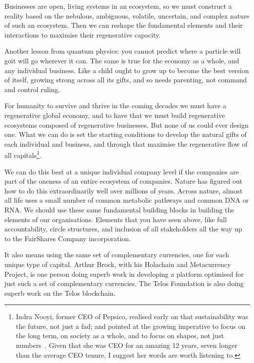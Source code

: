 Businesses are open, living systems in an ecosystem, so we must construct a reality based on the nebulous, ambiguous, volatile, uncertain, and complex nature of such an ecosystem. Then we can reshape the fundamental elements and their interactions to maximise their regenerative capacity.


Another lesson from quantum physics: you cannot predict where a particle will go\textemdash it will go wherever it can. The same is true for the economy as a whole, and any individual business. Like a child ought to grow up to become the best version of itself, growing strong across all its gifts, and so needs parenting, not command and control ruling. 


For humanity to survive and thrive in the coming decades we must have a regenerative global economy,  and to have that we must build regenerative ecosystems composed of regenerative businesses. But none of us could ever design one. What we can do is set the starting conditions to develop the natural gifts of each individual and business, and through that maximise the regenerative flow of all capitals\footnote{Indra Nooyi, former CEO of Pepsico, realised early on that sustainability was the future, not just a fad; and pointed at the growing imperative to focus on the long term, on society as a whole, and to focus on shapes, not just numbers~\cite{nooyi-shapes}. Given that she was CEO for an amazing 12 years, seven longer than the average CEO tenure, I suggest her words are worth listening to. }. 


We can do this best at a unique individual company level if the companies are part of the oneness of an entire ecosystem of companies. Nature  has figured out how to do this extraordinarily well over millions of years. Across nature, almost all life uses a small number of common metabolic pathways and common DNA  or RNA. We should use these same fundamental building blocks in building the elements of our organisations. Elements that you have seen above, like full accountability, circle structures, and inclusion of all stakeholders all the way up to the FairShares Company incorporation.


It also means using the same set of complementary currencies,  one for each unique type of capital. Arthur Brock,  with his Holachain and Metacurrency Project, is one person doing superb work in developing a platform optimised for just such a set of complementary currencies. The Telos Foundation  is also doing superb work on the Telos blockchain.


